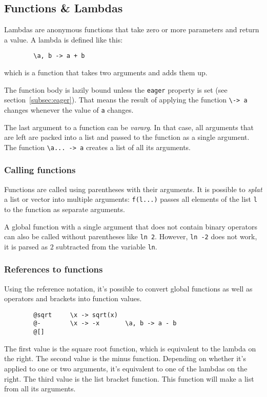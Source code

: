 \documentclass[10pt]{article}
\begin{document}
    \subsection{Functions \& Lambdas}\label{subsec:lambdas}
    Lambdas are anonymous functions that take zero or more parameters and return a value.
    A lambda is defined like this:
    \begin{verbatim}
        \a, b -> a + b
    \end{verbatim}
    which is a function that takes two arguments and adds them up.
    
    The function body is lazily bound unless the \verb|eager| property is set (see section~\ref{subsec:eager}).
    That means the result of applying the function \verb|\-> a| changes whenever the value of \verb|a| changes.
    
    The last argument to a function can be \textsl{vararg}.
    In that case, all arguments that are left are packed into a list and passed to the function as a single argument.
    The function \verb|\a... -> a| creates a list of all its arguments.
    
    \subsubsection{Calling functions}
    Functions are called using parentheses with their arguments.
    It is possible to \textsl{splat} a list or vector into multiple arguments:
    \verb|f(l...)| passes all elements of the list \verb|l| to the function as separate arguments.
    
    A global function with a single argument that does not contain binary operators can also be called without parentheses like \verb|ln 2|.
    However, \verb|ln -2| does not work, it is parsed as $ 2 $ subtracted from the variable \verb|ln|.

    \subsubsection{References to functions}
    Using the reference notation, it's possible to convert global functions as well as operators and brackets into function values.
    \begin{verbatim}
        @sqrt     \x -> sqrt(x)
        @-        \x -> -x       \a, b -> a - b
        @[]
    \end{verbatim}
    The first value is the square root function, which is equivalent to the lambda on the right.
    The second value is the minus function.
    Depending on whether it's applied to one or two arguments, it's equivalent to one of the lambdas on the right.
    The third value is the list bracket function.
    This function will make a list from all its arguments.
    
\end{document}
